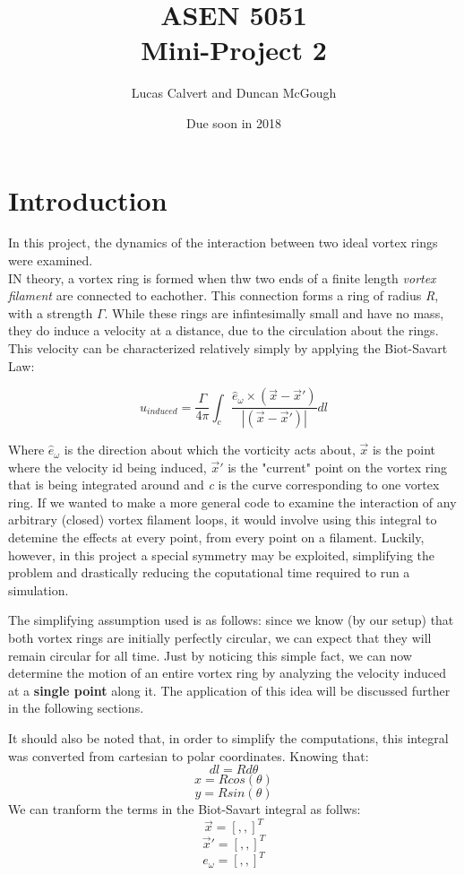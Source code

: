 \documentclass[10pt]{article}
\title{ASEN 5051\\ {\Large Mini-Project 2}}
\author{Lucas Calvert and Duncan McGough}
\date{Due soon in 2018}
\begin{document}
\maketitle

\tableofcontents
\listoffigures
\newpage

\section{Introduction}
In this project, the dynamics of the interaction between two ideal vortex rings were examined.\\

IN theory, a vortex ring is formed when thw two ends of a finite length \textit{vortex filament} are connected to eachother. This connection forms a ring of radius \textit{R}, with a strength $\Gamma$. While these rings are infintesimally small and have no mass, they do induce a velocity at a distance, due to the circulation about the rings. This velocity can be characterized relatively simply by applying the Biot-Savart Law:

\[ u_{induced} = \frac{\Gamma}{4\pi}\int_{c} \frac{\hat e_{\omega} \times (\vec x - \vec x')}{|(\vec x - \vec x')|} dl \]

Where $\hat e_{\omega}$ is the direction about which the vorticity acts about, $\vec x$ is the point where the velocity id being induced, $\vec x'$ is the "current" point on the vortex ring that is being integrated around and \textit{c} is the curve corresponding to one vortex ring. If we wanted to make a more general code to examine the interaction of any arbitrary (closed) vortex filament loops, it would involve using this integral to detemine the effects at every point, from every point on a filament. Luckily, however, in this project a special symmetry may be exploited, simplifying the problem and drastically reducing the coputational time required to run a simulation.

The simplifying assumption used is as follows: since we know (by our setup) that both vortex rings are initially perfectly circular, we can expect that they will remain circular for all time. Just by noticing this simple fact, we can now determine the motion of an entire vortex ring by analyzing the velocity induced at a \textbf{single point} along it. The application of this idea will be discussed further in the following sections.

It should also be noted that, in order to simplify the computations, this integral was converted from cartesian to polar coordinates. Knowing that: \[dl = Rd\theta\] \[x = Rcos(\theta)\] \[y = Rsin(\theta)\] We can tranform the terms in the Biot-Savart integral as follws: \[\vec x = [   ,   ,   ]^T\] \[\vec x' = [  ,  ,  ]^T\] \[e_{\omega} = [  ,  ,  ]^T\]
\end{document}
